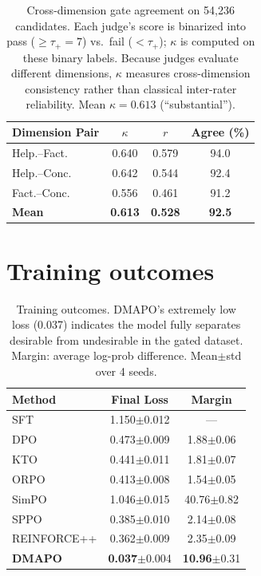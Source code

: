 \documentclass{article}
\newcommand{\method}{DMAPO}
\newcommand{\res}[2]{#1{\scriptsize$\pm$#2}}
\begin{document}
\begin{table}[h]
\centering
\caption{Cross-dimension gate agreement on 54,236 candidates. Each judge's score is binarized into pass ($\geq\tau_+{=}7$) vs.\ fail ($<\tau_+$); $\kappa$ is computed on these binary labels. Because judges evaluate different dimensions, $\kappa$ measures cross-dimension consistency rather than classical inter-rater reliability. Mean $\kappa = 0.613$ (``substantial'').}
\label{tab:agreement}
\vspace{0.5em}
\begin{tabular}{l ccc}
\toprule
\textbf{Dimension Pair} & \textbf{$\kappa$} & \textbf{$r$} & \textbf{Agree (\%)} \\
\midrule
Help.--Fact. & 0.640 & 0.579 & 94.0 \\
Help.--Conc. & 0.642 & 0.544 & 92.4 \\
Fact.--Conc. & 0.556 & 0.461 & 91.2 \\
\midrule
\textbf{Mean} & \textbf{0.613} & \textbf{0.528} & \textbf{92.5} \\
\bottomrule
\end{tabular}
\end{table}

\section{Training outcomes}
\label{app:training}

\begin{table}[h]
\centering
\caption{Training outcomes. \method{}'s extremely low loss (0.037) indicates the model fully separates desirable from undesirable in the gated dataset. Margin: average log-prob difference. Mean$\pm$std over 4 seeds.}
\label{tab:training}
\vspace{0.5em}
\begin{tabular}{l c c}
\toprule
\textbf{Method} & \textbf{Final Loss} & \textbf{Margin} \\
\midrule
SFT & \res{1.150}{0.012} & --- \\
DPO & \res{0.473}{0.009} & \res{1.88}{0.06} \\
KTO & \res{0.441}{0.011} & \res{1.81}{0.07} \\
ORPO & \res{0.413}{0.008} & \res{1.54}{0.05} \\
SimPO & \res{1.046}{0.015} & \res{40.76}{0.82} \\
SPPO & \res{0.385}{0.010} & \res{2.14}{0.08} \\
REINFORCE++ & \res{0.362}{0.009} & \res{2.35}{0.09} \\
\midrule
\textbf{DMAPO} & \res{\textbf{0.037}}{0.004} & \res{\textbf{10.96}}{0.31} \\
\bottomrule
\end{tabular}
\end{table}
\end{document}
